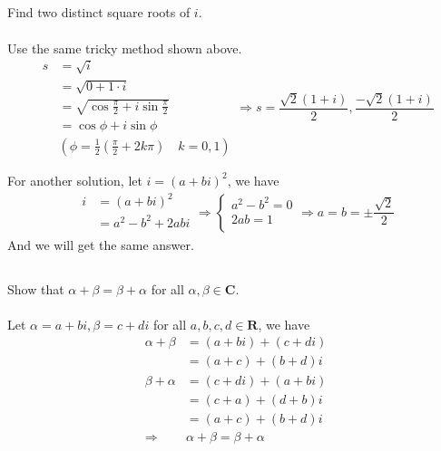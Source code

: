 \documentclass[a4paper]{article}
\begin{document}
\subsection{}
Find two distinct square roots of $i$.
\paragraph{}
Use the same tricky method shown above.
$$
    \begin{aligned}
        s & = \sqrt{i}                                               \\
          & = \sqrt{0+1 \cdot i}                                     \\
          & = \sqrt{\cos{\frac{\pi}{2}} + i\sin{\frac{\pi}{2}}}      \\
          & = \cos{\phi} + i\sin{\phi}                               \\
          & (\phi = \frac{1}{2}(\frac{\pi}{2}+2k\pi) \quad k = 0, 1)
    \end{aligned}
    \Rightarrow s = \frac{\sqrt{2}(1+i)}{2},\frac{-\sqrt{2}(1+i)}{2}
$$

For another solution, let $i = (a+bi)^2$, we have
$$
    \begin{aligned}
        i & = (a+bi)^2         \\
          & = a^2 - b^2 + 2abi \\
    \end{aligned}
    \Rightarrow
    \begin{cases}
        a^2 - b^2 = 0 \\
        2ab = 1       \\
    \end{cases}
    \Rightarrow
    a = b = \pm\frac{\sqrt{2}}{2}
$$
And we will get the same answer.

\subsection{}
Show that $\alpha + \beta = \beta + \alpha$ for all $\alpha, \beta \in \bm{C}.$
\paragraph{}
Let $\alpha = a + bi, \beta = c + di$ for all $a,b,c,d \in \bm{R}$, we have
$$
    \begin{aligned}
        \alpha + \beta    & = (a + bi) + (c + di)           \\
                          & = (a + c) + (b + d)i            \\
        \beta + \alpha    & = (c + di) + (a + bi)           \\
                          & = (c + a) + (d + b)i            \\
                          & = (a + c) + (b + d)i            \\
        \Rightarrow \quad & \alpha + \beta = \beta + \alpha
    \end{aligned}
$$
\end{document}
